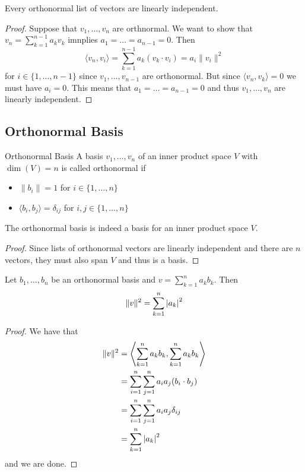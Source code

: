 \documentclass[a4paper]{article}
\begin{document}
\begin{prp}{}{} Every orthonormal list of vectors are linearly independent. \tcbline
\begin{proof}
Suppose that $v_1,\dots,v_n$ are orthnormal. We want to show that $v_n=\sum_{k=1}^{n-1}a_kv_k$ imnplies $a_1=\dots=a_{n-1}=0$. Then $$\langle v_n, v_i\rangle=\sum_{k=1}^{n-1}a_k(v_k\cdot v_i)=a_i\|v_i\|^2$$ for $i\in\{1,\dots,n-1\}$ since $v_1,\dots,v_{n-1}$ are orthonormal. But since $\langle v_n, v_k\rangle=0$ we must have $a_i=0$. This means that $a_1=\dots=a_{n-1}=0$ and thus $v_1,\dots,v_n$ are linearly independent. 
\end{proof}
\end{prp}

\subsection{Orthonormal Basis}
\begin{defn}{Orthonormal Basis}{} A basis $v_1,\dots,v_n$ of an inner product space $V$ with $\dim(V)=n$ is called orthonormal if 
\begin{itemize}
\item $\|b_i\|=1$ for $i\in\{1,\dots,n\}$
\item $\langle b_i,b_j\rangle=\delta_{ij}$ for $i,j\in\{1,\dots,n\}$
\end{itemize}
\end{defn}

\begin{prp}{}{} The orthonormal basis is indeed a basis for an inner product space $V$. \tcbline
\begin{proof}
Since lists of orthonormal vectors are linearly independent and there are $n$ vectors, they must also span $V$ and thus is a basis. 
\end{proof}
\end{prp}

\begin{thm}{}{} Let $b_1,\dots,b_n$ be an orthonormal basis and $v=\sum_{k=1}^na_kb_k$. Then $$\|v\|^2=\sum_{k=1}^n\abs{a_k}^2$$ \tcbline
\begin{proof}
We have that 
\begin{align*}
\|v\|^2&=\left\langle\sum_{k=1}^na_kb_k, \sum_{k=1}^na_kb_k\right\rangle \\
&=\sum_{i=1}^n\sum_{j=1}^na_ia_j(b_i\cdot b_j)\\
&=\sum_{i=1}^n\sum_{j=1}^na_ia_j\delta_{ij}\\
&=\sum_{k=1}^n\abs{a_k}^2
\end{align*}
and we are done. 
\end{proof}
\end{thm}
\end{document}
